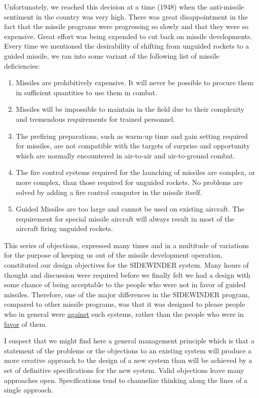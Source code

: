 \documentclass{memoir}
\begin{document}
Unfortunately, we reached this decision at a time (1948) when the anti-missile sentiment in the country was very high. There was great disappointment in the fact that the missile programs were progressing so slowly and that they were so expensive. Great effort was being expended to cut back on missile developments. Every time we mentioned the desirability of shifting from unguided rockets to a guided missile, we ran into some variant of the following list of missile deficiencies:

\begin{enumerate}
  \item Missiles are prohibitively expensive. It will never be possible to procure them in sufficient quantities to use them in combat.
  \item Missiles will be impossible to maintain in the field due to their complexity and tremendous requirements for trained personnel.
  \item The prefiring preparations, such as warm-up time and gain setting required for missiles, are not compatible with the targets of surprise and opportunity which are normally encountered in air-to-air and air-to-ground combat.
  \item The fire control systems required for the launching of missiles are complex, or more complex, than those required for unguided rockets. No problems are solved by adding a fire control computer in the missile itself.
  \item Guided Missiles are too large and cannot be used on existing aircraft. The requirement for special missile aircraft will always result in most of the aircraft firing unguided rockets.
\end{enumerate}

This series of objections, expressed many times and in a multitude of variations for the purpose of keeping us out of the missile development operation, constituted our design objectives for the SIDEWINDER system. Many hours of thought and discussion were required before we finally felt we had a design with some chance of being acceptable to the people who were not in favor of guided missiles. Therefore, one of the major differences in the SIDEWINDER program, compared to other missile programs, was that it was designed to please people who in general were \underline{against} such systems, rather than the people who were in \underline{favor} of them.

I suspect that we might find here a general management principle which is that a statement of the problems or the objections to an existing system will produce a more creative approach to the design of a new system than will be achieved by a set of definitive specifications for the new system. Valid objections leave many approaches open. Specifications tend to channelize thinking along the lines of a single approach.
\end{document}
